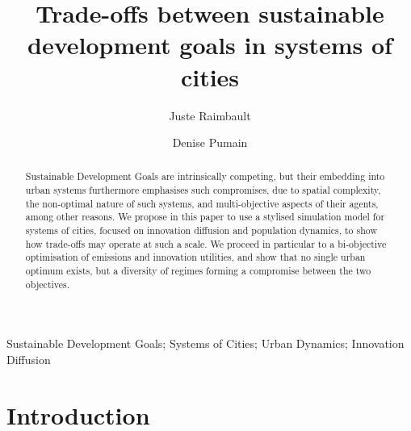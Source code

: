 \documentclass[final,5p,times,twocolumn,authoryear]{elsarticle}
\begin{document}
\begin{frontmatter}

\title{Trade-offs between sustainable development goals in systems of cities}

\author[label1]{Juste Raimbault}
\author[label2]{Denise Pumain}

\address[label1]{CASA, University College London}
\address[label2]{G{\'e}ographie-cit{\'e}s, Universit{\'e} Paris 1}




\begin{abstract}
    Sustainable Development Goals are intrinsically competing, but their embedding into urban systems furthermore emphasises such compromises, due to spatial complexity, the non-optimal nature of such systems, and multi-objective aspects of their agents, among other reasons. We propose in this paper to use a stylised simulation model for systems of cities, focused on innovation diffusion and population dynamics, to show how trade-offs may operate at such a scale. We proceed in particular to a bi-objective optimisation of emissions and innovation utilities, and show that no single urban optimum exists, but a diversity of regimes forming a compromise between the two objectives.
\end{abstract}

\begin{keyword}
Sustainable Development Goals; Systems of Cities; Urban Dynamics; Innovation Diffusion
\end{keyword}

\end{frontmatter}


\linenumbers



\section{Introduction}
\end{document}
